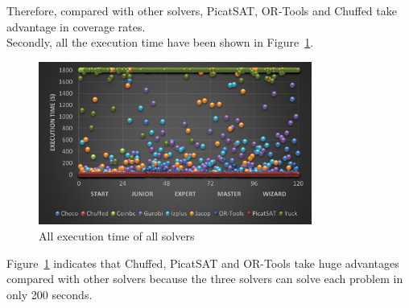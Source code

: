 Therefore, compared with other solvers, PicatSAT, OR-Tools and Chuffed take advantage in coverage rates.
\\Secondly, all the execution time have been shown in Figure~\ref{fig:execution time}.
\begin{figure}[H]
    \centering
    \includegraphics[width=0.8\textwidth]{figs/all_point_IQtwist.png}
    \caption{All execution time of all solvers}
    \label{fig:execution time}
\end{figure}
Figure~\ref{fig:execution time} indicates that Chuffed, PicatSAT and OR-Tools take huge advantages compared with other solvers because the three solvers can solve each problem in only 200 seconds.
